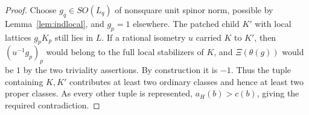 \begin{proof}
Choose $g_q\in SO(L_q)$ of nonsquare unit spinor norm, possible by Lemma~\ref{lem:indlocal}, and $g_p=1$ elsewhere. The patched child $K'$ with local lattices $g_pK_p$ still lies in $L$. If a rational isometry $u$ carried $K$ to $K'$, then $(u^{-1}g_p)_p$ would belong to the full local stabilizers of $K$, and $\Xi(\theta(g))$ would be $1$ by the two triviality assertions. By construction it is $-1$. Thus the tuple containing $K,K'$ contributes at least two ordinary classes and hence at least two proper classes. As every other tuple is represented, $a_H(b)>c(b)$, giving the required contradiction.
\end{proof}
